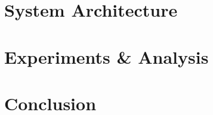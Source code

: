 \section{System Architecture} %









\section{Experiments \& Analysis}\label{sec:ExpRes}


\section{Conclusion}





\appendix
%


